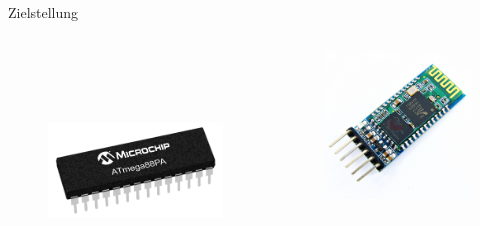 \documentclass[hyphens]{beamer}
\begin{document}
\begin{frame}{Zielstellung}
\begin{columns}[T]
\begin{column}{0.33\textwidth}
 ~ \\ ~ \\  ~ \\
\begin{figure}
\includegraphics[width=\textwidth]{pics/ATmega88PA.png}
\end{figure}
\end{column}
\pause

\begin{column}{0.33\textwidth}
\begin{figure}
\includegraphics[width=\textwidth]{pics/HC05.png}
\end{figure}
\end{column}
\end{columns}
 \end{frame}
 
\end{document}
